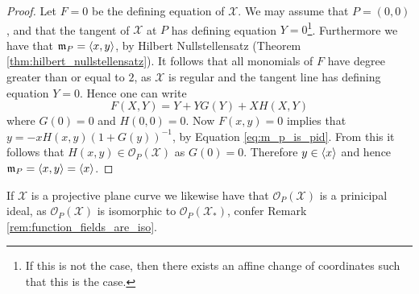 \begin{proof}
  Let $F = 0$ be the defining equation of $\mathcal{X}$. We may assume that $P = (0, 0)$, and that the tangent of $\mathcal{X}$ at $P$ has defining equation $Y = 0$\footnote{If this is not the case, then there exists an affine change of coordinates such that this is the case.}.
  Furthermore we have that $\mathfrak{m}_{P} = \langle x, y\rangle$, by Hilbert Nullstellensatz (Theorem \ref{thm:hilbert_nullstellensatz}).
  It follows that all monomials of $F$ have degree greater than or equal to $2$, as $\mathcal{X}$ is regular and the tangent line has defining equation $Y = 0$. Hence one can write
\begin{equation}\label{eq:m_p_is_pid}
  F(X, Y) = Y + Y G(Y) + X H(X, Y)
\end{equation}
where $G(0) = 0$ and $H(0, 0) = 0$. Now $F(x, y) = 0$ implies that $y = -x H(x,y) (1 + G(y))^{-1}$, by Equation \eqref{eq:m_p_is_pid}. From this it follows that $H(x, y) \in \mathcal{O}_{P}(\mathcal{X})$ as $G(0) = 0$. Therefore $y \in \langle x\rangle$ and hence $\mathfrak{m}_{P} = \langle x, y\rangle = \langle x\rangle$.
\end{proof}

\begin{remark}\label{rem:projective_is_also_dvr}
   If $\mathcal{X}$ is a projective plane curve we likewise have that $\mathcal{O}_{P}(\mathcal{X})$ is a prinicipal ideal, as $\mathcal{O}_{P}(\mathcal{X})$ is isomorphic to $\mathcal{O}_{P}(\mathcal{X}_{*})$, confer Remark \ref{rem:function_fields_are_iso}.
\end{remark}

%

